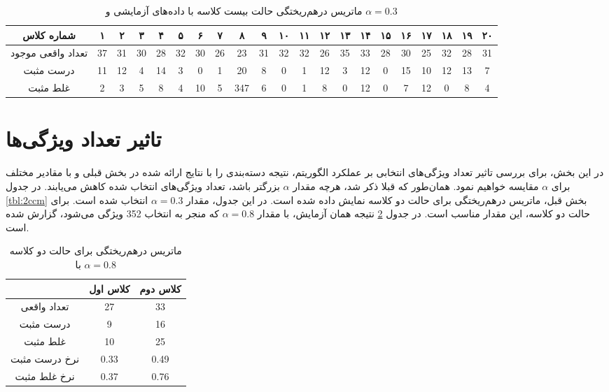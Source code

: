 \documentclass[11.5pt,a4paper]{article}
\begin{document}
\begin{table}[h]
\center
\caption{ماتریس درهم‌ریختگی حالت بیست کلاسه با داده‌های آزمایشی و $\alpha = 0.3$}
\label{tbl:20ccm171ts}
\begin{tabular}{c | c | c | c | c | c | c | c | c | c | c | c | c | c | c | c | c | c | c | c | c }
  شماره کلاس & ۱ & ۲ & ۳ & ۴ & ۵ & ۶ & ۷ & ۸ & ۹ & ۱۰ & ۱۱ & ۱۲ & ۱۳ & ۱۴ & ۱۵ & ۱۶ & ۱۷ & ۱۸ & ۱۹ & ۲۰ \\
\hline
\hline
تعداد واقعی موجود& 37  &  31  &  30  &  28  &  32  &  30  &  26  &  23  &  31  &  32  & 32   &  26  &  35  &  33  &  28  &  30  &  25  &  32  &  28  &   31 \\
درست مثبت& 11  &  12  &  4  &  14  &  3  &  0  &  1  &  20  &  8  &  0  &  1  &  12  & 3   &  12  &  0  &  15  &  10  &   12 &  13  &  7  \\
غلط مثبت&  2 &  3  & 5   &  8  &  4  &  10  &  5  &  347  &  6  & 0   &  1  &  8  & 0   &   12 &  0  &  7  &  12  &  0  &  8  &  4  \\

\end{tabular}
\end{table}

\section{تاثیر تعداد ویژگی‌ها}
در این بخش، برای بررسی تاثیر تعداد ویژگی‌های انتخابی بر عملکرد الگوریتم،‌ نتیجه دسته‌بندی را با نتایج ارائه شده در بخش قبلی و با مقادیر مختلف برای $\alpha$ مقایسه خواهیم نمود. همان‌طور که قبلا ذکر شد،‌ هرچه مقدار $\alpha$ بزرگتر باشد، تعداد ویژگی‌های انتخاب شده کاهش می‌یابند. در جدول \ref{tbl:2ccm} بخش قبل، ماتریس درهم‌ریختگی برای حالت دو کلاسه نمایش داده شده است. در این جدول،‌ مقدار $\alpha = 0.3$ انتخاب شده است. برای حالت دو کلاسه،‌ این مقدار مناسب است. در جدول 
\ref{tbl:2ccm8}
نتیجه همان آزمایش، با مقدار $\alpha = 0.8$ که منجر به انتخاب 
352
ویژگی می‌شود،
گزارش شده است. 

\begin{table}[h]
\center
\caption{ماتریس درهم‌ریختگی برای حالت دو کلاسه با $\alpha = 0.8$}
\label{tbl:2ccm8}
\begin{tabular}{c | c | c}
& کلاس اول & کلاس دوم
\\
\hline
\hline

تعداد واقعی &  27& 33
\\
درست مثبت &9&16
\\
غلط مثبت&10&25
\\
نرخ درست مثبت&0.33&0.49
\\
نرخ غلط مثبت&0.37&0.76
\\

\end{tabular}
\end{table}
\end{document}
